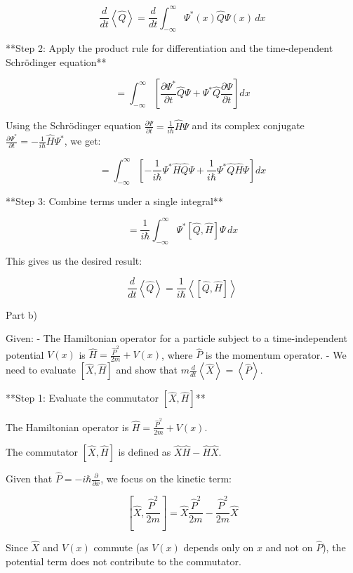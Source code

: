 \[
\frac{d}{dt}\left<\hat{Q}\right> = \frac{d}{dt}\int_{-\infty}^{\infty} \Psi^{*}(x) \hat{Q} \Psi(x) \, dx
\]

**Step 2: Apply the product rule for differentiation and the time-dependent Schrödinger equation**

\[
= \int_{-\infty}^{\infty} \left[ \frac{\partial \Psi^{*}}{\partial t} \hat{Q} \Psi + \Psi^{*} \hat{Q} \frac{\partial \Psi}{\partial t} \right] dx
\]

Using the Schrödinger equation \( \frac{\partial\Psi}{\partial t} = \frac{1}{i\hbar}\hat{H}\Psi \) and its complex conjugate \( \frac{\partial\Psi^{*}}{\partial t} = -\frac{1}{i\hbar}\hat{H}\Psi^{*} \), we get:

\[
= \int_{-\infty}^{\infty} \left[ -\frac{1}{i\hbar} \Psi^{*} \hat{H} \hat{Q} \Psi + \frac{1}{i\hbar} \Psi^{*} \hat{Q} \hat{H} \Psi \right] dx
\]

**Step 3: Combine terms under a single integral**

\[
= \frac{1}{i\hbar} \int_{-\infty}^{\infty} \Psi^{*} \left[ \hat{Q}, \hat{H} \right] \Psi \, dx
\]

This gives us the desired result:

\[
\frac{d}{dt}\left<\hat{Q}\right> = \frac{1}{i\hbar}\left< \left[ \hat{Q}, \hat{H} \right] \right>
\]

Part b)

Given:
- The Hamiltonian operator for a particle subject to a time-independent potential \( V(x) \) is \( \hat{H} = \frac{\hat{P}^2}{2m} + V(x) \), where \( \hat{P} \) is the momentum operator.
- We need to evaluate \( \left[ \hat{X}, \hat{H}\right] \) and show that \( m\frac{d}{dt}\left<\hat{X}\right> = \left<\hat{P}\right> \).

**Step 1: Evaluate the commutator \(\left[ \hat{X}, \hat{H}\right]\)**

The Hamiltonian operator is \( \hat{H} = \frac{\hat{P}^2}{2m} + V(x) \).

The commutator \( \left[ \hat{X}, \hat{H}\right] \) is defined as \( \hat{X}\hat{H} - \hat{H}\hat{X} \).

Given that \( \hat{P} = -i\hbar\frac{\partial}{\partial x} \), we focus on the kinetic term:

\[
\left[ \hat{X}, \frac{\hat{P}^2}{2m} \right] = \hat{X}\frac{\hat{P}^2}{2m} - \frac{\hat{P}^2}{2m}\hat{X}
\]

Since \( \hat{X} \) and \( V(x) \) commute (as \( V(x) \) depends only on \( x \) and not on \( \hat{P} \)), the potential term does not contribute to the commutator.

